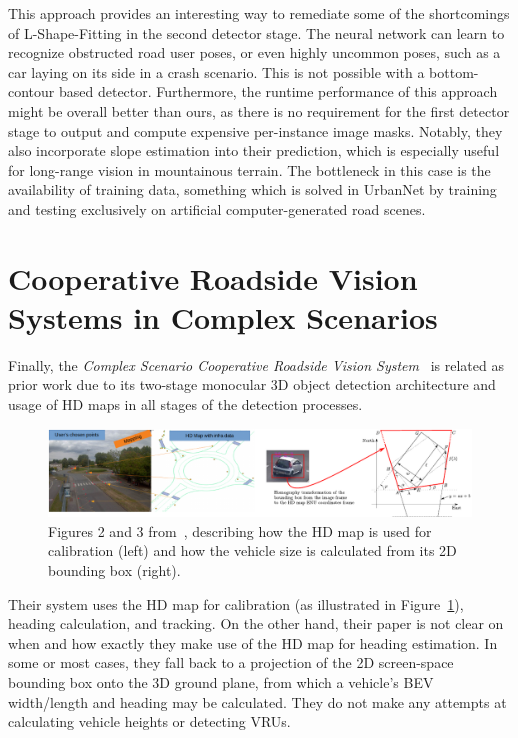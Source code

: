 This approach provides an interesting way to remediate some of the shortcomings of L-Shape-Fitting in the second detector stage.
The neural network can learn to recognize obstructed road user poses, or even highly uncommon poses, such as a car laying on its side in a crash scenario.
This is not possible with a bottom-contour based detector.
Furthermore, the runtime performance of this approach might be overall better than ours, as there is no requirement for the first detector stage to output and compute expensive per-instance image masks.
Notably, they also incorporate slope estimation into their prediction, which is especially useful for long-range vision in mountainous terrain.
The bottleneck in this case is the availability of training data, something which is solved in UrbanNet by training and testing exclusively on artificial computer-generated road scenes.

\section{Cooperative Roadside Vision Systems in Complex Scenarios}
\label{sec:related-crvis}

Finally, the \textit{Complex Scenario Cooperative Roadside Vision System}~\cite{masi2021augmented} is related as prior work due to its two-stage monocular 3D object detection architecture and usage of HD maps in all stages of the detection processes.

\begin{figure}[htb]
    \centering
    \includegraphics[width=1.0\linewidth]{figures/coop_roadside_vis_aug_perception_fig}
    \caption{Figures 2 and 3 from~\cite{masi2021augmented}, describing how the HD map is used for calibration (left) and how the vehicle size is calculated from its 2D bounding box (right).}
    \label{fig:related-crvis}
\end{figure}

Their system uses the HD map for calibration (as illustrated in Figure~\ref{fig:related-crvis}), heading calculation, and tracking.
On the other hand, their paper is not clear on when and how exactly they make use of the HD map for heading estimation.
In some or most cases, they fall back to a projection of the 2D screen-space bounding box onto the 3D ground plane, from which a vehicle's BEV width/length and heading may be calculated.
They do not make any attempts at calculating vehicle heights or detecting VRUs.

